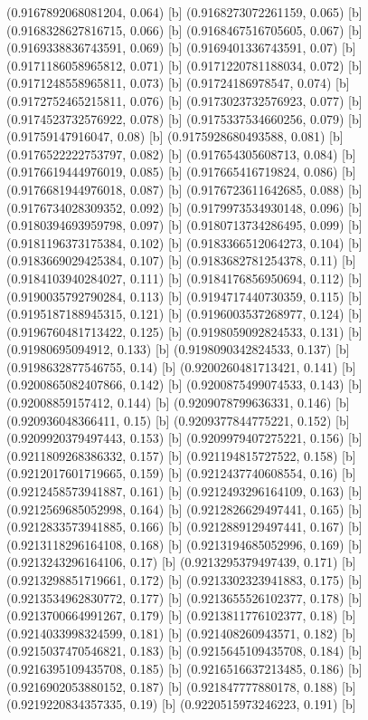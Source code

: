 {{{(0.9167892068081204, 0.064) [b] 
(0.9168273072261159, 0.065) [b] 
(0.9168328627816715, 0.066) [b] 
(0.9168467516705605, 0.067) [b] 
(0.9169338836743591, 0.069) [b] 
(0.9169401336743591, 0.07) [b] 
(0.9171186058965812, 0.071) [b] 
(0.9171220781188034, 0.072) [b] 
(0.9171248558965811, 0.073) [b] 
(0.91724186978547, 0.074) [b] 
(0.9172752465215811, 0.076) [b] 
(0.9173023732576923, 0.077) [b] 
(0.9174523732576922, 0.078) [b] 
(0.9175337534660256, 0.079) [b] 
(0.91759147916047, 0.08) [b] 
(0.9175928680493588, 0.081) [b] 
(0.9176522222753797, 0.082) [b] 
(0.917654305608713, 0.084) [b] 
(0.9176619444976019, 0.085) [b] 
(0.917665416719824, 0.086) [b] 
(0.9176681944976018, 0.087) [b] 
(0.9176723611642685, 0.088) [b] 
(0.9176734028309352, 0.092) [b] 
(0.9179973534930148, 0.096) [b] 
(0.9180394693959798, 0.097) [b] 
(0.9180713734286495, 0.099) [b] 
(0.9181196373175384, 0.102) [b] 
(0.9183366512064273, 0.104) [b] 
(0.9183669029425384, 0.107) [b] 
(0.9183682781254378, 0.11) [b] 
(0.9184103940284027, 0.111) [b] 
(0.9184176856950694, 0.112) [b] 
(0.9190035792790284, 0.113) [b] 
(0.9194717440730359, 0.115) [b] 
(0.9195187188945315, 0.121) [b] 
(0.9196003537268977, 0.124) [b] 
(0.9196760481713422, 0.125) [b] 
(0.9198059092824533, 0.131) [b] 
(0.91980695094912, 0.133) [b] 
(0.9198090342824533, 0.137) [b] 
(0.9198632877546755, 0.14) [b] 
(0.9200260481713421, 0.141) [b] 
(0.9200865082407866, 0.142) [b] 
(0.9200875499074533, 0.143) [b] 
(0.92008859157412, 0.144) [b] 
(0.9209078799636331, 0.146) [b] 
(0.920936048366411, 0.15) [b] 
(0.9209377844775221, 0.152) [b] 
(0.9209920379497443, 0.153) [b] 
(0.9209979407275221, 0.156) [b] 
(0.9211809268386332, 0.157) [b] 
(0.921194815727522, 0.158) [b] 
(0.9212017601719665, 0.159) [b] 
(0.9212437740608554, 0.16) [b] 
(0.9212458573941887, 0.161) [b] 
(0.9212493296164109, 0.163) [b] 
(0.9212569685052998, 0.164) [b] 
(0.9212826629497441, 0.165) [b] 
(0.9212833573941885, 0.166) [b] 
(0.9212889129497441, 0.167) [b] 
(0.9213118296164108, 0.168) [b] 
(0.9213194685052996, 0.169) [b] 
(0.9213243296164106, 0.17) [b] 
(0.9213295379497439, 0.171) [b] 
(0.9213298851719661, 0.172) [b] 
(0.9213302323941883, 0.175) [b] 
(0.9213534962830772, 0.177) [b] 
(0.9213655526102377, 0.178) [b] 
(0.9213700664991267, 0.179) [b] 
(0.9213811776102377, 0.18) [b] 
(0.9214033998324599, 0.181) [b] 
(0.921408260943571, 0.182) [b] 
(0.9215037470546821, 0.183) [b] 
(0.9215645109435708, 0.184) [b] 
(0.9216395109435708, 0.185) [b] 
(0.9216516637213485, 0.186) [b] 
(0.9216902053880152, 0.187) [b] 
(0.921847777880178, 0.188) [b] 
(0.9219220834357335, 0.19) [b] 
(0.9220515973246223, 0.191) [b] 
}}}
